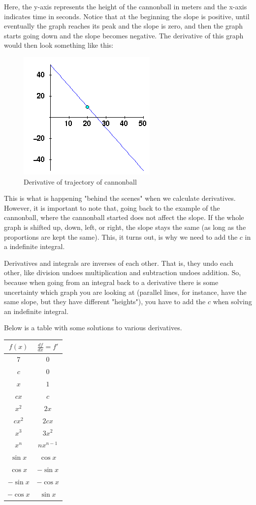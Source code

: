 \documentclass[12pt]{article}
\begin{document}
Here, the y-axis represents the height of the cannonball in meters and the x-axis indicates time in seconds. Notice that at the beginning the slope is positive, until eventually the graph reaches its peak and the slope is zero, and then the graph starts going down and the slope becomes negative. The derivative of this graph would then look something like this:

\begin{figure}[H]
\caption{Derivative of trajectory of cannonball}
\includegraphics[scale=0.8]{derivative.png}
\end{figure}

This is what is happening "behind the scenes" when we calculate derivatives. However, it is important to note that, going back to the example of the cannonball, where the cannonball started does not affect the slope. If the whole graph is shifted up, down, left, or right, the slope stays the same (as long as the proportions are kept the same). This, it turns out, is why we need to add the $c$ in a indefinite integral. 

Derivatives and integrals are inverses of each other. That is, they undo each other, like division undoes multiplication and subtraction undoes addition. So, because when going from an integral back to a derivative there is some uncertainty which graph you are looking at (parallel lines, for instance, have the same slope, but they have different "heights"), you have to add the $c$ when solving an indefinite integral.

Below is a table with some solutions to various derivatives.

\begin{tabular}{c|c}
    $f(x)$ & $\frac{df}{dx} = f'$\\
    \hline
       $7$  & $0$ \\
        $c$ & $0$ \\
        $x$ & $1$ \\
        $cx$ & $c$ \\
        $x^2$ & $2x$ \\
        $cx^2$ & $2cx$ \\
        $x^3$ & $3x^2$ \\
        $x^n$ & $nx^{n-1}$ \\
        $\sin x$ & $\cos x$ \\
        $\cos x$ & $-\sin x$ \\
        $- \sin x$ & $- \cos x$ \\
        $-\cos x$ & $\sin x$
\end{tabular}
\end{document}
